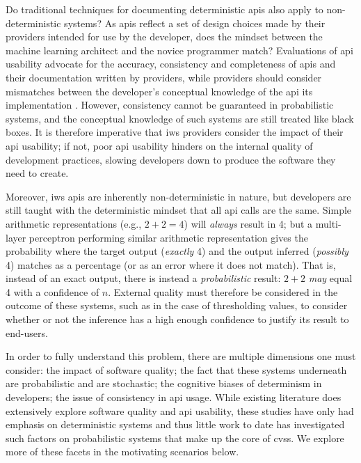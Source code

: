 Do traditional techniques for documenting deterministic \glspl{api} also apply to non-deterministic systems? As \glspl{api} reflect a set of design choices made by their providers intended for use by the developer, does the mindset between the machine learning architect and the novice programmer match? Evaluations of \gls{api} usability advocate for the accuracy, consistency and completeness of \glspl{api} and their documentation \citep{Piccioni:2013em,Robillard:2009uk} written by providers, while providers should consider mismatches between the developer's conceptual knowledge of the \gls{api} its implementation \citep{Ko:2011fb}. However, consistency cannot be guaranteed in probabilistic systems, and the conceptual knowledge of such systems are still treated like black boxes. It is therefore imperative that \gls{iws} providers consider the impact of their \gls{api} usability; if not, poor \gls{api} usability hinders on the internal quality of development practices, slowing developers down to produce the software they need to create.

Moreover, \gls{iws} \glspl{api} are inherently non-deterministic in nature, but developers are still taught with the deterministic mindset that all \gls{api} calls are the same. Simple arithmetic representations (e.g., $2+2=4$) will \textit{always} result in 4; but a multi-layer perceptron  performing similar arithmetic representation \citep{Blake:1998vd} gives the probability where the target output (\textit{exactly} 4) and the output inferred (\textit{possibly} 4) matches as a percentage (or as an error where it does not match). That is, instead of an exact output, there is instead a \textit{probabilistic} result: $2+2$ \textit{may} equal 4 with a confidence of $n$. External quality must therefore be considered in the outcome of these systems, such as in the case of thresholding values, to consider whether or not the inference has a high enough confidence to justify its result to end-users.

In order to fully understand this problem, there are multiple dimensions one must consider: the impact of software quality; the fact that these systems underneath are probabilistic and are stochastic; the cognitive biases of determinism in developers; the issue of consistency in \gls{api} usage. While existing literature does extensively explore software quality and \gls{api} usability, these studies have only had emphasis on deterministic systems and thus little work to date has investigated such factors on probabilistic systems that make up the core of \glspl{cvs}. We explore more of these facets in the motivating scenarios below.

